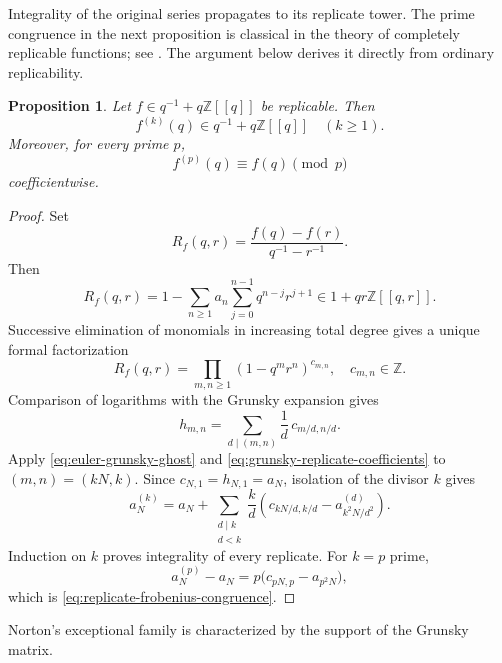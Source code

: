 \documentclass[11pt]{amsart}
\newtheorem{prop}[thm]{Proposition}
\theoremstyle{definition}
\theoremstyle{remark}
\numberwithin{equation}{section}
\begin{document}
Integrality of the original series propagates to its replicate tower. The prime congruence in the next proposition is classical in the theory of completely replicable functions; see \cite{alexander-replicable}. The argument below derives it directly from ordinary replicability.

\begin{prop}\label{prop:replicate-integrality-frobenius}
Let $f\in q^{-1}+q\mathbb Z[[q]]$ be replicable. Then
\[
f^{(k)}(q)\in q^{-1}+q\mathbb Z[[q]]
\quad(k\geq1).
\]
Moreover, for every prime $p$,
\begin{equation}\label{eq:replicate-frobenius-congruence}
f^{(p)}(q)\equiv f(q)\pmod p
\end{equation}
coefficientwise.
\end{prop}

\begin{proof}
Set
\[
R_f(q,r)=\frac{f(q)-f(r)}{q^{-1}-r^{-1}}.
\]
Then
\[
R_f(q,r)
=1-\sum_{n\geq1}a_n\sum_{j=0}^{n-1}q^{n-j}r^{j+1}
\in1+qr\mathbb Z[[q,r]].
\]
Successive elimination of monomials in increasing total degree gives a unique formal factorization
\begin{equation}\label{eq:two-variable-euler-product}
R_f(q,r)=\prod_{m,n\geq1}(1-q^mr^n)^{c_{m,n}},
\quad c_{m,n}\in\mathbb Z.
\end{equation}
Comparison of logarithms with the Grunsky expansion gives
\begin{equation}\label{eq:euler-grunsky-ghost}
h_{m,n}
=
\sum_{d\mid(m,n)}\frac1d\,c_{m/d,n/d}.
\end{equation}
Apply \eqref{eq:euler-grunsky-ghost} and \eqref{eq:grunsky-replicate-coefficients} to $(m,n)=(kN,k)$. Since $c_{N,1}=h_{N,1}=a_N$, isolation of the divisor $k$ gives
\begin{equation}\label{eq:replicate-integrality-recursion}
a_N^{(k)}
=
a_N+
\sum_{\substack{d\mid k\\ d<k}}
\frac{k}{d}
\left(c_{kN/d,k/d}-a_{k^2N/d^2}^{(d)}\right).
\end{equation}
Induction on $k$ proves integrality of every replicate. For $k=p$ prime,
\[
a_N^{(p)}-a_N
=p\bigl(c_{pN,p}-a_{p^2N}\bigr),
\]
which is \eqref{eq:replicate-frobenius-congruence}.
\end{proof}

Norton's exceptional family is characterized by the support of the Grunsky matrix.
\end{document}
